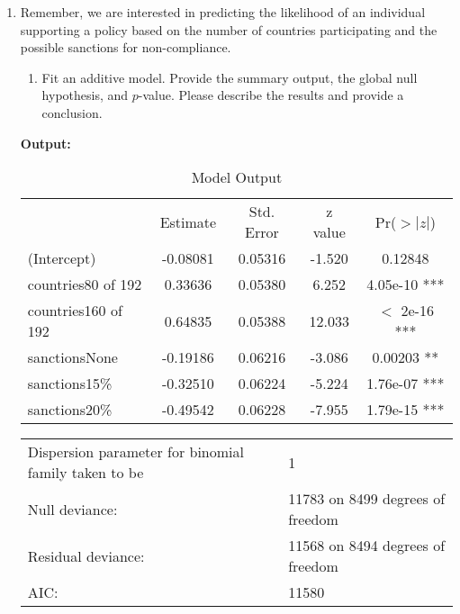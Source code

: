 \documentclass[12pt,letterpaper]{article}
\begin{document}
\begin{enumerate}
	\item
	Remember, we are interested in predicting the likelihood of an individual supporting a policy based on the number of countries participating and the possible sanctions for non-compliance.
	\begin{enumerate}
		\item [] Fit an additive model. Provide the summary output, the global null hypothesis, and $p$-value. Please describe the results and provide a conclusion.
	\end{enumerate}
	
	\vspace{0.25cm}
	\textbf{Output:}\\
	\begin{table}[ht]
		\centering
			\caption{Model Output}
		\begin{tabular}{lcccc}
		\hline 
	
			& Estimate & Std. Error & z value & Pr($>|z|$) \\ 
		
			(Intercept) & -0.08081 & 0.05316 & -1.520 & 0.12848 \\ 
			countries80 of 192 & 0.33636 & 0.05380 & 6.252 & 4.05e-10 *** \\ 
			countries160 of 192 & 0.64835 & 0.05388 & 12.033 & $<$ 2e-16 *** \\ 
			sanctionsNone & -0.19186 & 0.06216 & -3.086 & 0.00203 ** \\ 
			sanctions15\% & -0.32510 & 0.06224 & -5.224 & 1.76e-07 *** \\ 
			sanctions20\% & -0.49542 & 0.06228 & -7.955 & 1.79e-15 *** \\ 
		\hline
		\end{tabular}
	
		
	\end{table}

	\bigskip
	\begin{tabular}{ll}
	\hline
		Dispersion parameter for binomial family taken to be & 1 \\
		Null deviance: & 11783  on 8499  degrees of freedom \\
		Residual deviance: & 11568  on 8494  degrees of freedom \\
		AIC: & 11580 \\
	

\end{tabular}
\end{enumerate}
\end{document}
